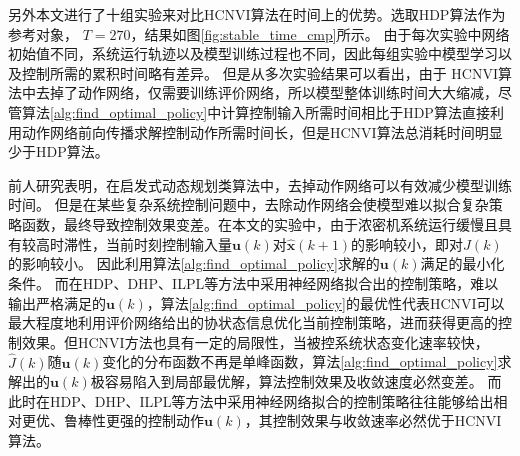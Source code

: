 另外本文进行了十组实验来对比HCNVI算法在时间上的优势。选取HDP算法作为参考对象，
$T=270$，结果如图\ref{fig:stable_time_cmp}所示。
由于每次实验中网络初始值不同，系统运行轨迹以及模型训练过程也不同，因此每组实验中模型学习以及控制所需的累积时间略有差异。
但是从多次实验结果可以看出，由于
HCNVI算法中去掉了动作网络，仅需要训练评价网络，所以模型整体训练时间大大缩减，尽管算法\ref{alg:find_optimal_policy}中计算控制输入所需时间相比于HDP算法直接利用动作网络前向传播求解控制动作所需时间长，但是HCNVI算法总消耗时间明显少于HDP算法。

前人研究表明\cite{Luo2016}\cite{Padhi2006}，在启发式动态规划类算法中，去掉动作网络可以有效减少模型训练时间。
但是在某些复杂系统控制问题中，去除动作网络会使模型难以拟合复杂策略函数，最终导致控制效果变差。在本文的实验中，由于浓密机系统运行缓慢且具有较高时滞性，当前时刻控制输入量${\pmb
u}(k)$对$\hat{\pmb x}(k+1)$的影响较小，即对$\hat{J}(k)$的影响较小。
因此利用算法\ref{alg:find_optimal_policy}求解的${\pmb
u}(k)$满足的最小化条件。
而在HDP、DHP、ILPL等方法中采用神经网络拟合出的控制策略，难以输出严格满足的${\pmb
u}(k)$，算法\ref{alg:find_optimal_policy}的最优性代表HCNVI可以最大程度地利用评价网络给出的协状态信息优化当前控制策略，进而获得更高的控制效果。但HCNVI方法也具有一定的局限性，当被控系统状态变化速率较快，$\hat{J}(k)$随${\pmb
u}(k)$变化的分布函数不再是单峰函数，算法\ref{alg:find_optimal_policy}求解出的${\pmb
u}(k)$极容易陷入到局部最优解，算法控制效果及收敛速度必然变差。
而此时在HDP、DHP、ILPL等方法中采用神经网络拟合的控制策略往往能够给出相对更优、鲁棒性更强的控制动作${\pmb
u}(k)$，其控制效果与收敛速率必然优于HCNVI算法。




